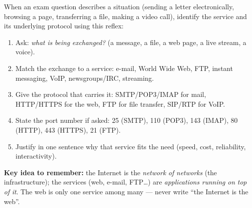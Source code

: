 \documentclass[11pt]{article}
\newcommand{\cle}[1]{{\popxbold\color{popdark}#1}}
\begin{document}
\begin{methode}
When an exam question describes a situation (sending a letter electronically, browsing a page, transferring a file, making a video call), identify the service and its underlying protocol using this reflex:
\begin{enumerate}
\item Ask: \emph{what is being exchanged?} (a message, a file, a web page, a live stream, a voice).
\item Match the exchange to a \cle{service}: e-mail, World Wide Web, FTP, instant messaging, VoIP, newsgroups/IRC, streaming.
\item Give the \cle{protocol} that carries it: SMTP/POP3/IMAP for mail, HTTP/HTTPS for the web, FTP for file transfer, SIP/RTP for VoIP.
\item State the \cle{port number} if asked: 25 (SMTP), 110 (POP3), 143 (IMAP), 80 (HTTP), 443 (HTTPS), 21 (FTP).
\item Justify in one sentence why that service fits the need (speed, cost, reliability, interactivity).
\end{enumerate}
\textbf{Key idea to remember:} the Internet is the \emph{network of networks} (the infrastructure); the services (web, e-mail, FTP\ldots) are \emph{applications running on top of it}. The web is only one service among many --- never write ``the Internet is the web''.
\end{methode}
\end{document}
